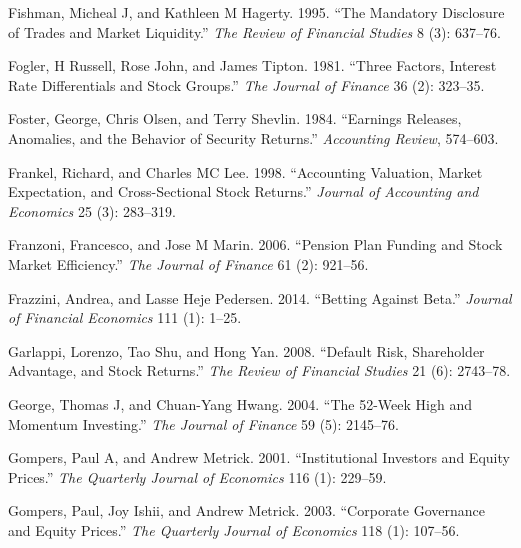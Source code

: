 \documentclass[
  letterpaper,
  DIV=11,
  numbers=noendperiod]{scrreprt}
\newlength{\cslhangindent}
\newlength{\cslentryspacingunit} %
\newenvironment{CSLReferences}[2] %
 {%
  \setlength{\parindent}{0pt}
  \ifodd #1
  \let\oldpar\par
  \def\par{\hangindent=\cslhangindent\oldpar}
  \fi
  \setlength{\parskip}{#2\cslentryspacingunit}
 }%
 {}
\begin{document}
\begin{CSLReferences}{1}{0}
\leavevmode{}%
Fishman, Micheal J, and Kathleen M Hagerty. 1995. {``The Mandatory
Disclosure of Trades and Market Liquidity.''} \emph{The Review of
Financial Studies} 8 (3): 637--76.

\leavevmode{}%
Fogler, H Russell, Rose John, and James Tipton. 1981. {``Three Factors,
Interest Rate Differentials and Stock Groups.''} \emph{The Journal of
Finance} 36 (2): 323--35.

\leavevmode{}%
Foster, George, Chris Olsen, and Terry Shevlin. 1984. {``Earnings
Releases, Anomalies, and the Behavior of Security Returns.''}
\emph{Accounting Review}, 574--603.

\leavevmode{}%
Frankel, Richard, and Charles MC Lee. 1998. {``Accounting Valuation,
Market Expectation, and Cross-Sectional Stock Returns.''} \emph{Journal
of Accounting and Economics} 25 (3): 283--319.

\leavevmode{}%
Franzoni, Francesco, and Jose M Marin. 2006. {``Pension Plan Funding and
Stock Market Efficiency.''} \emph{The Journal of Finance} 61 (2):
921--56.

\leavevmode{}%
Frazzini, Andrea, and Lasse Heje Pedersen. 2014. {``Betting Against
Beta.''} \emph{Journal of Financial Economics} 111 (1): 1--25.

\leavevmode{}%
Garlappi, Lorenzo, Tao Shu, and Hong Yan. 2008. {``Default Risk,
Shareholder Advantage, and Stock Returns.''} \emph{The Review of
Financial Studies} 21 (6): 2743--78.

\leavevmode{}%
George, Thomas J, and Chuan-Yang Hwang. 2004. {``The 52-Week High and
Momentum Investing.''} \emph{The Journal of Finance} 59 (5): 2145--76.

\leavevmode{}%
Gompers, Paul A, and Andrew Metrick. 2001. {``Institutional Investors
and Equity Prices.''} \emph{The Quarterly Journal of Economics} 116 (1):
229--59.

\leavevmode{}%
Gompers, Paul, Joy Ishii, and Andrew Metrick. 2003. {``Corporate
Governance and Equity Prices.''} \emph{The Quarterly Journal of
Economics} 118 (1): 107--56.


\end{CSLReferences}
\end{document}
